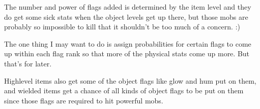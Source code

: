 The number and power of flags added is determined by the item level and
they do get some sick stats when the object levels get up there, but those
mobs are probably so impossible to kill that it shouldn't be too much of
a concern. :)

The one thing I may want to do is assign probabilities for certain flags
to come up within each flag rank so that more of the physical stats come
up more. But that's for later.


Highlevel items also get some of the object flags like glow and hum put on
them, and wielded items get a chance of all kinds of object flags to
be put on them since those flags are required to hit powerful mobs.

